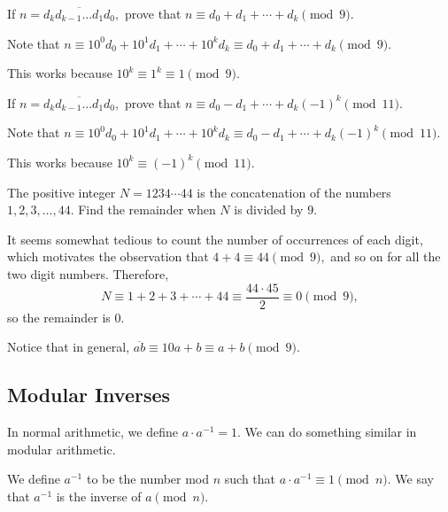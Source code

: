 \documentclass[blue,onecol]{shooting}
\begin{document}
\begin{exam}
If $n=\overline{d_{k}d_{k-1}...d_{1}d_{0}},$ prove that $n\equiv d_0+d_1+\cdots+d_{k}\pmod{9}.$
\end{exam}

\begin{sol}
Note that $n\equiv 10^0d_0+10^1d_1+\cdots+10^{k}d_{k}\equiv d_0+d_1+\cdots+d_k\pmod{9}.$

This works because $10^k\equiv 1^k\equiv 1\pmod{9}.$
\end{sol}

\begin{exam}
If $n=\overline{d_{k}d_{k-1}...d_{1}d_{0}},$ prove that $n\equiv d_0-d_1+\cdots+d_{k}(-1)^k\pmod{11}.$
\end{exam}

\begin{sol}
Note that $n\equiv 10^0d_0+10^1d_1+\cdots+10^{k}d_{k}\equiv d_0-d_1+\cdots+d_k(-1)^k\pmod{11}.$

This works because $10^k\equiv (-1)^k\pmod{11}.$
\end{sol}

\begin{exam}
The positive integer $N=1234\cdots44$ is the concatenation of the numbers $1,2,3,\ldots,44.$ Find the remainder when $N$ is divided by $9.$
\end{exam}

\begin{sol}
It seems somewhat tedious to count the number of occurrences of each digit, which motivates the observation that $4+4\equiv 44\pmod{9},$ and so on for all the two digit numbers. Therefore,
\[N\equiv 1+2+3+\cdots+44\equiv\frac{44\cdot 45}{2}\equiv 0\pmod{9},\]
so the remainder is $0.$
\end{sol}
Notice that in general, $\overline{ab}\equiv 10a+b\equiv a+b\pmod{9}.$

\subsection{Modular Inverses}
In normal arithmetic, we define $a\cdot a^{-1}=1.$ We can do something similar in modular arithmetic.

\begin{defi}We define $a^{-1}$ to be the number mod $n$ such that $a\cdot a^{-1}\equiv 1 \pmod{n}.$ We say that $a^{-1}$ is the inverse of $a \pmod{n}.$\end{defi}
\end{document}
